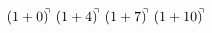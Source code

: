 \documentclass[preview]{standalone}
\begin{document}
\begin{align*}
(1+0)^{\hspace{-0.1cm}\urcorner} \ (1+4)^{\hspace{-0.1cm}\urcorner} \ (1+7)^{\hspace{-0.1cm}\urcorner} \ (1+10)^{\hspace{-0.1cm}\urcorner}
\end{align*}
\end{document}
